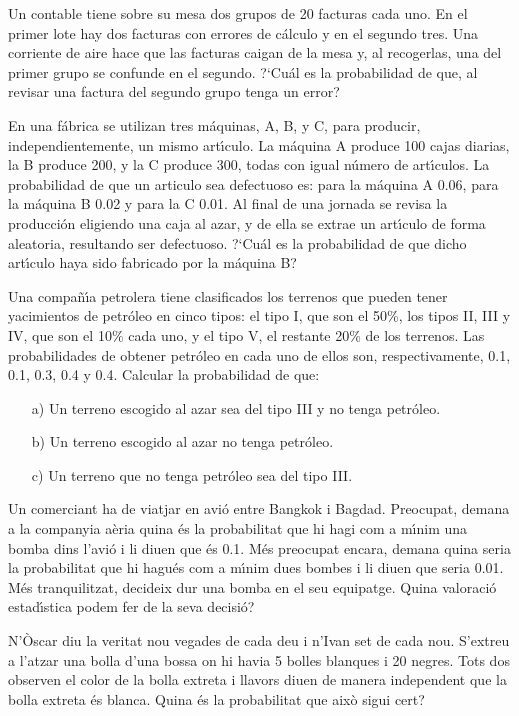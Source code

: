 \documentclass[12pt]{article}
\begin{document}
\probl
    Un contable tiene sobre su mesa dos grupos de 20 facturas cada uno. En
    el primer lote hay dos facturas con errores de c\'alculo y en el segundo
    tres. Una corriente de aire hace que las facturas caigan de la mesa y, al
    re\-co\-ger\-las, una del primer grupo se confunde en el segundo. ?`Cu\'al
    es la probabilidad de que, al revisar una factura del segundo grupo tenga
    un error?
    
\probl
    En una f\'abrica se utilizan tres m\'aquinas, A, B, y C, para producir,
    independientemente, un mismo art\'{\i}culo. La m\'aquina A produce 100
    cajas diarias, la B produce 200, y la C produce 300, todas con igual
    n\'umero de art\'{\i}culos. La probabilidad de que un articulo sea
    defectuoso es: para la m\'aquina A  0.06, para la m\'aquina B 0.02 y
    para la C 0.01. Al final de una jornada se revisa la producci\'on
    eligiendo una caja al azar, y de ella se extrae un art\'{\i}culo de forma
    aleatoria, resultando ser defectuoso. ?`Cu\'al es la probabilidad de que
    dicho art\'{\i}culo haya sido fabricado por la m\'aquina B?


\probl
    Una compa\~{n}\'{\i}a petrolera tiene clasificados los terrenos que
    pueden tener yacimientos de petr\'oleo en cinco tipos: el tipo I, que
    son  el 50\%, los tipos II, III y IV, que son el 10\% cada uno, y el
    tipo V, el  restante 20\% de los terrenos. Las probabilidades de
    obtener petr\'oleo en  cada uno de ellos son, respectivamente,
    0.1, 0.1, 0.3, 0.4 y 0.4. Calcular la probabilidad de que:
    \begin{itemize}
    \item [a)] Un terreno escogido al azar sea del tipo III y no
    tenga petr\'oleo.

        \item [b)] Un terreno escogido al azar no tenga petr\'oleo.

        \item [c)] Un terreno que no tenga petr\'oleo sea del tipo III.
    \end{itemize}
		
\probl  Un comerciant ha de viatjar en avi\'{o} entre Bangkok i
Bagdad. Preocupat, demana a la companyia a\`{e}ria quina \'{e}s la
probabilitat que hi hagi com a m\'{\i}nim una bomba dins l'avi\'{o} i li
diuen que \'{e}s 0.1. M\'{e}s preocupat encara, demana quina seria la
probabilitat que hi hagu\'{e}s com a m\'{\i}nim dues bombes i li diuen que
seria 0.01. M\'{e}s tranquilitzat, decideix dur una bomba en el seu
equipatge. Quina valoraci\'{o} estad\'{\i}stica podem fer de la seva
decisi\'{o}? 


\probl  N'\`{O}scar diu la veritat nou vegades de cada deu i n'Ivan
set de cada nou. S'extreu a l'atzar una bolla d'una bossa on hi
havia 5 bolles blanques i 20 negres. Tots dos observen el color de
la bolla extreta i llavors diuen de manera independent que la
bolla extreta \'{e}s blanca. Quina \'{e}s la probabilitat que aix\`{o} sigui
cert? 
\end{document}

